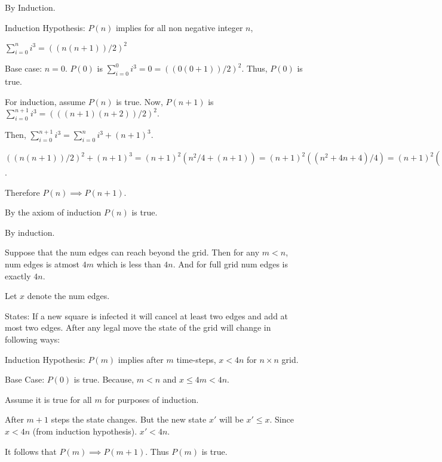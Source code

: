 \documentclass[titlepage,12pt]{book}
\begin{document}
\begin{solution}
    By Induction.
    
    
    Induction Hypothesis: $P(n)$ implies for all non negative integer $n$, 
    
    $\sum_{i=0}^{n} i^{3} = ((n(n+1)) / 2)^{2}$

    
    Base case: $n = 0$. $P(0)$ is $\sum_{i=0}^{0} i^{3} = 0 = ((0(0+1)) / 2)^{2}$.
    Thus, $P(0)$ is true.

    For induction, assume $P(n)$ is true.
    Now, $P(n+1)$ is $\sum_{i=0}^{n+1} i^{3} = (((n + 1)(n+2)) / 2)^{2}$.

    Then, $\sum_{i=0}^{n+1} i^{3} = \sum_{i=0}^{n} i^{3} + (n + 1)^{3}$.

    $((n(n+1))/2)^{2} + (n + 1)^{3} = (n + 1)^{2}(n^{2}/4 + (n + 1)) = (n + 1)^{2}((n^{2}+ 4n + 4)/4) = (n + 1)^{2}((n+ 2)^{2}/4) = (((n + 1) (n + 2)) / 2)^{2}$.

    Therefore $P(n) \implies P(n+1)$.

    By the axiom of induction $P(n)$ is true.

\end{solution}


\begin{solution}
    By induction.
    
    Suppose that the num edges can reach beyond the grid.
    Then for any $m < n$, num edges is atmost $4m$ which is less than $4n$.
    And for full grid num edges is exactly $4n$.

    Let $x$ denote the num edges.

    States:
    If a new square is infected 
        it will cancel at least two edges and add at most two edges.
    After any legal move the state of the grid will change in following ways:


    Induction Hypothesis: $P(m)$ implies after $m$ time-steps, 
        $x < 4n$ for $n \times n$ grid.

    Base Case: $P(0)$ is true. Because, $m < n$ and $x \leq 4m < 4n$.

    Assume it is true for all $m$ for purposes of induction.

    After $m + 1$ steps the state changes. But the new state  $x'$
    will be $x' \leq x$. Since $x < 4n$ (from induction hypothesis).
    $x' < 4n$.

    It follows that $P(m) \implies P(m + 1)$.
    Thus $P(m)$ is true.
\end{solution}
\end{document}
